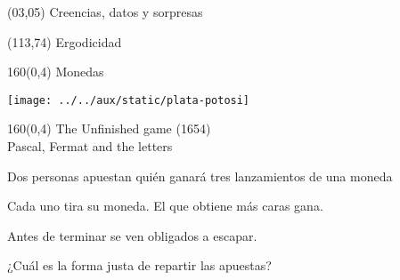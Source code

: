 \documentclass[shownotes,aspectratio=169]{beamer}
\begin{document}
\color{black!85}
\large

 

\begin{frame}
 
 \begin{textblock}{90}(03,05)
 \centering \huge  \textcolor{black!40}{Creencias, datos y sorpresas}
\end{textblock}

 \begin{textblock}{47}(113,74)
\centering \Large  \textcolor{white!55}{Ergodicidad}
\end{textblock}

{}
\end{frame}


\begin{frame}[plain]
 \begin{textblock}{160}(0,4)
  \centering \LARGE Monedas
 \end{textblock}

\vspace{1cm}

\texttt{[image: ../../aux/static/plata-potosi]}
 
\end{frame}

\begin{frame}[plain]
 \begin{textblock}{160}(0,4)
  \centering \Large The Unfinished game (1654) \\ \normalsize Pascal, Fermat and the letters
 \end{textblock}
 \vspace{1cm}

Dos personas apuestan quién ganará tres lanzamientos de una moneda

\vspace{0.5cm}

Cada uno tira su moneda. El que obtiene más caras gana.

\vspace{0.5cm}

Antes de terminar se ven obligados a escapar. 

\vspace{0.5cm}

¿Cuál es la forma justa de repartir las apuestas?
 
\end{frame}
\end{document}
